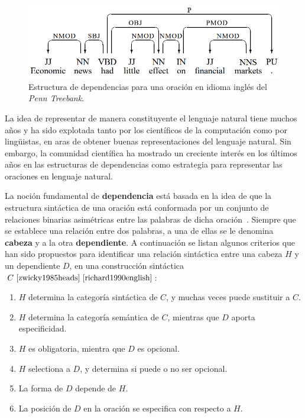 \begin{figure}[h!]
	\centering
	\includegraphics[width=0.8\linewidth]{Graphics/dep_links.png}
	\caption{Estructura de dependencias para una oraci\'on en idioma ingl\'es del \emph{Penn Treebank}.}\label{fig:dep_links}
\end{figure}

La idea de representar de manera constituyente el lenguaje natural tiene muchos a\~nos y ha sido explotada tanto por los cient\'ificos de la computaci\'on como por ling\"uistas, en aras de obtener buenas representaciones del lenguaje natural. Sin embargo, la comunidad cient\'ifica ha mostrado un creciente inter\'es en los \'ultimos a\~nos en las estructuras de dependencias como estrategia para representar las oraciones en lenguaje natural.

La noci\'on fundamental de \textbf{dependencia} est\'a basada en la idea de que la estructura sint\'actica de una oraci\'on est\'a conformada por un conjunto de relaciones binarias asim\'etricas entre las palabras de dicha oraci\'on~\cite{nivre2005dependency}. Siempre que se establece una relaci\'on entre dos palabras, a una de ellas se le denomina \textbf{cabeza} y a la otra \textbf{dependiente}. A continuaci\'on se listan algunos criterios que han sido propuestos para identificar una relaci\'on sint\'actica entre una cabeza $H$ y un dependiente $D$, en una construcci\'on sint\'actica $C~\cite{zwicky1985heads}~\cite{richard1990english}$:

\begin{enumerate}
	\item $H$ determina la categor\'ia sint\'actica de $C$, y muchas veces puede sustituir a $C$.
	
	\item $H$ determina la categor\'ia sem\'antica de $C$, mientras que $D$ aporta especificidad.
	
	\item $H$ es obligatoria, mientra que $D$ es opcional.
	
	\item $H$ selectiona a $D$, y determina si puede o no ser opcional.
	
	\item La forma de $D$ depende de $H$.
	
	\item La posici\'on de $D$ en la oraci\'on se especifica con respecto a $H$.
\end{enumerate}

